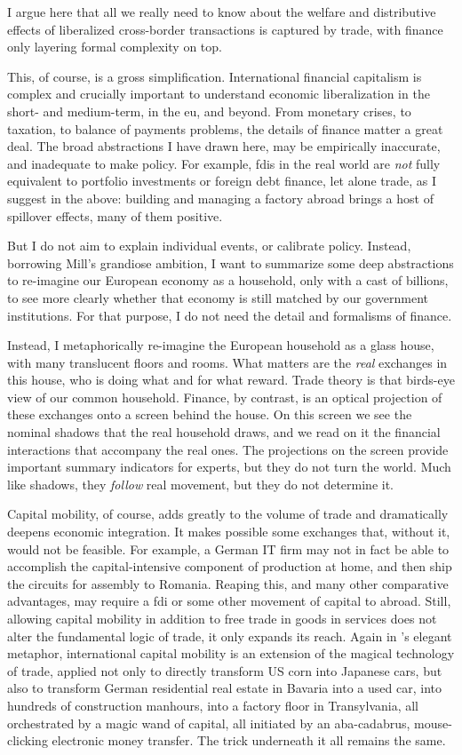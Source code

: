 I argue here that all we really need to know about the welfare and distributive effects of liberalized cross-border transactions is captured by trade, with finance only layering formal complexity on top.

This, of course, is a gross simplification.
International financial capitalism is complex and crucially important to understand economic liberalization in the short- and medium-term, in the \gls{eu}, and beyond.
From monetary crises, to taxation, to balance of payments problems, the details of finance matter a great deal.
The broad abstractions I have drawn here, may be empirically inaccurate, and inadequate to make policy.
For example, \glspl{fdi} in the real world are \emph{not} fully equivalent to portfolio investments or foreign debt finance, let alone trade, as I suggest in the above:
building and managing a factory abroad brings a host of spillover effects, many of them positive.

But I do not aim to explain individual events, or calibrate policy.
Instead, borrowing Mill's grandiose ambition, I want to summarize some deep abstractions to re-imagine our European economy as a household, only with a cast of billions, to see more clearly whether that economy is still matched by our government institutions.
For that purpose, I do not need the detail and formalisms of finance.

Instead, I metaphorically re-imagine the European household as a glass house, with many translucent floors and rooms.
What matters are the \emph{real} exchanges in this house, who is doing what and for what reward.
Trade theory is that birds-eye view of our common household.
Finance, by contrast, is an optical projection of these exchanges onto a screen behind the house.
On this screen we see the nominal shadows that the real household draws, and we read on it the financial interactions that accompany the real ones.
The projections on the screen provide important summary indicators for experts, but they do not turn the world.
Much like shadows, they \emph{follow} real movement, but they do not determine it.

Capital mobility, of course, adds greatly to the volume of trade and dramatically deepens economic integration.
It makes possible some exchanges that, without it, would not be feasible.
For example, a German IT firm may not in fact be able to accomplish the capital-intensive component of production at home, and then ship the circuits for assembly to Romania.
Reaping this, and many other comparative advantages, may require a \gls{fdi} or some other movement of capital to abroad.
Still, allowing capital mobility in addition to free trade in goods in services does not alter the fundamental logic of trade, it only expands its reach.
Again in \citeauthor{Mankiw-2004-aa}'s elegant metaphor, international capital mobility is an extension of the magical technology of trade, applied not only to directly transform US corn into Japanese cars, but also to transform German residential real estate in Bavaria into a used car, into hundreds of construction manhours, into a factory floor in Transylvania, all orchestrated by a magic wand of capital, all initiated by an aba-cadabrus, mouse-clicking electronic money transfer.
The trick underneath it all remains the same.

